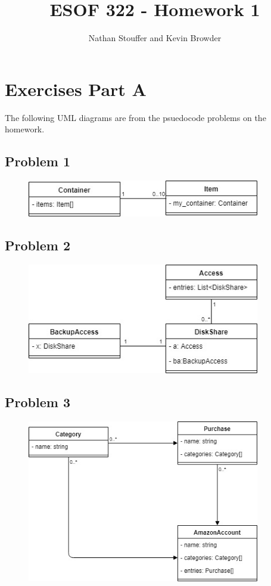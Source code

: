 \documentclass{article}
\begin{document}
\title{ESOF 322 - Homework 1}
\author{Nathan Stouffer and Kevin Browder}

\maketitle
\newpage

\section*{Exercises Part A}

The following UML diagrams are from the psuedocode problems on the homework.

\subsection*{Problem 1}

\begin{figure}[h]
	\centering
	\includegraphics[width=4in]{Problem1.jpg}
\end{figure}

\subsection*{Problem 2}

\begin{figure}[h]
	\centering
	\includegraphics[width=4in]{Problem2.jpg}
\end{figure}

\subsection*{Problem 3}

\begin{figure}[h]
	\centering
	\includegraphics[width=4in]{Problem3.jpg}
\end{figure}
\end{document}
